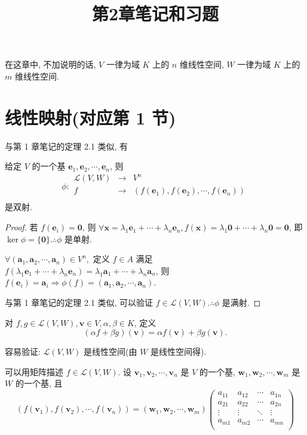 \documentclass{ctexart}
\title{第2章笔记和习题}
\begin{document}
\maketitle
在这章中, 不加说明的话, $V$ 一律为域 $K$ 上的 $n$ 维线性空间, $W$ 一律为域 $K$ 上的 $m$ 维线性空间.
\section{线性映射(对应第 1 节)}
与第 1 章笔记的定理 2.1 类似, 有
\begin{theorem}\label{t1.1}
    给定 $V$ 的一个基 $\boldsymbol{e}_1,\boldsymbol{e}_2,\cdots,\boldsymbol{e}_n$, 则
    \[\phi:\begin{array}{rcl}
        \mathcal{L}(V,W) & \to & V^n \\
        f & \to & (f(\boldsymbol{e}_1),f(\boldsymbol{e}_2),\cdots,f(\boldsymbol{e}_n)) \\
    \end{array}\]
    是双射.
\end{theorem}
\begin{proof}
    若 $f(\boldsymbol{e}_i)=\boldsymbol{0}$, 则 $\forall\boldsymbol{x}=\lambda_1\boldsymbol{e}_1+\cdots+\lambda_n\boldsymbol{e}_n,f(\boldsymbol{x})=\lambda_1\boldsymbol{0}+\cdots+\lambda_n\boldsymbol{0}=\boldsymbol{0}$, 即 $\ker\phi=\{\boldsymbol{0}\}.\therefore\phi$ 是单射.

    $\forall(\boldsymbol{a}_1,\boldsymbol{a}_2,\cdots,\boldsymbol{a}_n)\in V^n,$ 定义 $f\in A$ 满足 $f(\lambda_1\boldsymbol{e}_1+\cdots+\lambda_n\boldsymbol{e}_n)=\lambda_1\boldsymbol{a}_1+\cdots+\lambda_n\boldsymbol{a}_n$, 则 $f(\boldsymbol{e}_i)=\boldsymbol{a}_i\Rightarrow\phi(f)=(\boldsymbol{a}_1,\boldsymbol{a}_2,\cdots,\boldsymbol{a}_n)$.

    与第 1 章笔记的定理 2.1 类似, 可以验证 $f\in\mathcal{L}(V,W).\therefore\phi$ 是满射.
\end{proof}

对 $f,g\in\mathcal{L}(V,W),\boldsymbol{v}\in V,\alpha,\beta\in K$, 定义
\[(\alpha f+\beta g)(\boldsymbol{v})=\alpha f(\boldsymbol{v})+\beta g(\boldsymbol{v}).\]

容易验证: $\mathcal{L}(V,W)$ 是线性空间(由 $W$ 是线性空间得).

可以用矩阵描述 $f\in\mathcal{L}(V,W)$. 设 $\boldsymbol{v}_1,\boldsymbol{v}_2,\cdots,\boldsymbol{v}_n$ 是 $V$ 的一个基, $\boldsymbol{w}_1,\boldsymbol{w}_2,\cdots,\boldsymbol{w}_m$ 是 $W$ 的一个基, 且
\begin{equation}\label{eq1.1}
    (f(\boldsymbol{v}_1),f(\boldsymbol{v}_2),\cdots,f(\boldsymbol{v}_n))=(\boldsymbol{w}_1,\boldsymbol{w}_2,\cdots,\boldsymbol{w}_m)\begin{pmatrix}
        a_{11} & a_{12} & \cdots & a_{1n} \\
        a_{21} & a_{22} & \cdots & a_{2n} \\
        \vdots & \vdots & \ddots & \vdots \\
        a_{m1} & a_{m2} & \cdots & a_{mn} \\
    \end{pmatrix}
\end{equation}
\end{document}
